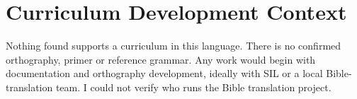 \documentclass[12pt]{article}
\begin{document}
\section{Curriculum Development Context}
Nothing found supports a curriculum in this language. There is no confirmed orthography, primer or reference grammar. Any work would begin with documentation and orthography development, ideally with SIL or a local Bible-translation team. I could not verify who runs the Bible translation project.
\end{document}
